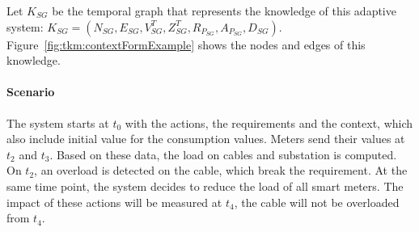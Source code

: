 Let $K_{SG}$ be the temporal graph that represents the knowledge of this adaptive system: $K_{SG} = (N_{SG}, E_{SG}, V^T_{SG}, Z^T_{SG}, R_{P_{SG}}, A_{P_{SG}}, D_{SG})$.
Figure~\ref{fig:tkm:contextFormExample} shows the nodes and edges of this knowledge.

\paragraph{Scenario}
The system starts at $t_0$ with the actions, the requirements and the context, which also include initial value for the consumption values.
Meters send their values at $t_2$ and $t_3$.
Based on these data, the load on cables and substation is computed.
On $t_2$, an overload is detected on the cable, which break the requirement.
At the same time point, the system decides to reduce the load of all smart meters.
The impact of these actions will be measured at $t_4$, \ie the cable will not be overloaded from $t_4$.